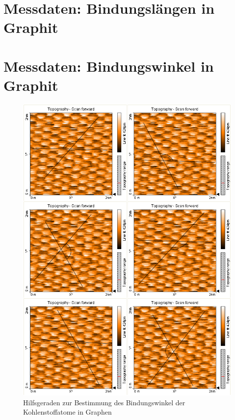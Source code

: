 \documentclass[10pt, a4paper]{article}
\begin{document}
\newpage

\begin{appendix}
\section{Messdaten: Bindungslängen in Graphit}
\label{messw:laenge}


\newpage

\section{Messdaten: Bindungswinkel in Graphit}
\begin{figure}[!h]
\centering
\includegraphics[width=1\textwidth]{./grafiken/collage.png}
\caption{Hilfsgeraden zur Bestimmung des Bindungswinkel der Kohlenstoffatome in Graphen}
\label{fig:hilfsgeraden}
\end{figure}

\end{appendix}
\end{document}
